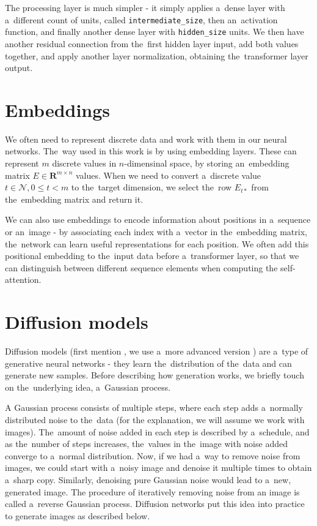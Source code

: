 The processing layer is much simpler - it simply applies a~dense layer with a~different count of units, called \texttt{intermediate\_size}, then an~activation function, and finally another dense layer with \texttt{hidden\_size} units. We then have another residual connection from the~first hidden layer input, add both values together, and apply another layer normalization, obtaining the~transformer layer output.




\section{Embeddings}

We often need to represent discrete data and work with them in our neural networks. The~way used in this work is by using embedding layers. These can represent $m$ discrete values in $n$-dimensinal space, by storing an~embedding matrix $E \in \mathbf{R}^{m \times n}$ values. When we need to convert a~discrete value $t \in \mathcal{N}, 0 \leq t < m$ to the~target dimension, we select the~row $E_{t*}$ from the~embedding matrix and return it.

We can also use embeddings to encode information about positions in a~sequence or an~image - by associating each index with a~vector in the~embedding matrix, the~network can learn useful representations for each position. We often add this positional embedding to the~input data before a~transformer layer, so that we can distinguish between different sequence elements when computing the self-attention.


\section{Diffusion models}

Diffusion models (first mention \citep{diffusion_model_ddpm}, we use a~more advanced version \citep{diffusion_model_ddim}) are a~type of generative neural networks - they learn the~distribution of the~data and can generate new samples. Before describing how generation works, we briefly touch on the~underlying idea, a~Gaussian process.

A Gaussian process consists of multiple steps, where each step adds a~normally distributed noise to the~data (for the explanation, we will assume we work with images). The~amount of noise added in each step is described by a~schedule, and as the~number of steps increases, the~values in the~image with noise added converge to a~normal distribution. Now, if we had a~way to remove noise from images, we could start with a~noisy image and denoise it multiple times to obtain a~sharp copy. Similarly, denoising pure Gaussian noise would lead to a~new, generated image. The procedure of iteratively removing noise from an image is called a~reverse Gaussian process. Diffusion networks put this idea into practice to generate images as described below.

